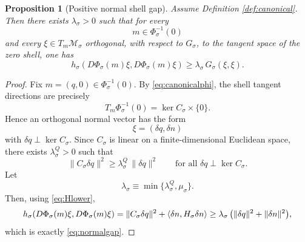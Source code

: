 \documentclass[11pt]{article}
\newcommand{\SubSpace}[1]{\mathcal M_{#1}}
\newcommand{\SubMetric}[1]{G_{#1}}
\newcommand{\SubTargetMetric}[1]{h_{#1}}
\newcommand{\ShellEquation}[1]{\Phi_{#1}}
\newcommand{\ConstraintMap}[1]{C_{#1}}
\newcommand{\NormalOperator}[1]{H_{#1}}
\newtheorem{proposition}{Proposition}
\begin{document}
\begin{proposition}[Positive normal shell gap]
\label{prop:normalgap}
Assume Definition \ref{def:canonical}. Then there exists \(\lambda_{\sigma}>0\) such that for every
\[
m\in \ShellEquation{\sigma}^{-1}(0)
\]
and every \(\xi\in T_{m}\SubSpace{\sigma}\) orthogonal, with respect to \(\SubMetric{\sigma}\), to the tangent space of the zero shell, one has
\begin{equation}
\SubTargetMetric{\sigma}
\!\left(
D\ShellEquation{\sigma}(m)\xi,
D\ShellEquation{\sigma}(m)\xi
\right)
\ge
\lambda_{\sigma}\,
\SubMetric{\sigma}(\xi,\xi).
\label{eq:normalgap}
\end{equation}
\end{proposition}

\begin{proof}
Fix \(m=(q,0)\in\ShellEquation{\sigma}^{-1}(0)\). By \eqref{eq:canonicalphi}, the shell tangent directions are precisely
\[
T_{m}\ShellEquation{\sigma}^{-1}(0)
=
\ker\ConstraintMap{\sigma}\times\{0\}.
\]
Hence an orthogonal normal vector has the form
\[
\xi=(\delta q,\delta n)
\]
with \(\delta q\perp\ker\ConstraintMap{\sigma}\). Since \(\ConstraintMap{\sigma}\) is linear on a finite-dimensional Euclidean space, there exists \(\lambda_{\sigma}^{Q}>0\) such that
\[
\|\ConstraintMap{\sigma}\delta q\|^{2}
\ge
\lambda_{\sigma}^{Q}\,\|\delta q\|^{2}
\qquad
\text{for all }\delta q\perp\ker\ConstraintMap{\sigma}.
\]
Let
\[
\lambda_{\sigma}\equiv \min\{\lambda_{\sigma}^{Q},\mu_{\sigma}\}.
\]
Then, using \eqref{eq:Hlower},
\[
\SubTargetMetric{\sigma}
\!\left(
D\ShellEquation{\sigma}(m)\xi,
D\ShellEquation{\sigma}(m)\xi
\right)
=
\|\ConstraintMap{\sigma}\delta q\|^{2}
+
\ev{\delta n,\NormalOperator{\sigma}\delta n}
\ge
\lambda_{\sigma}\,
\bigl(\|\delta q\|^{2}+\|\delta n\|^{2}\bigr),
\]
which is exactly \eqref{eq:normalgap}.
\end{proof}
\end{document}
